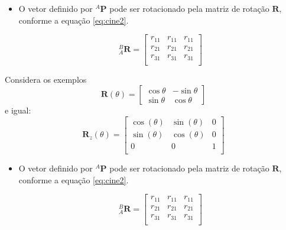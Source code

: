 \documentclass[t]{beamer}
\begin{document}
\begin{frame}[t]
	\begin{itemize}
		\item O vetor definido por ${}^A\mathbf{P}$ pode ser rotacionado pela matriz de rotação $\mathbf{R}$, conforme a equação \eqref{eq:cine2}.

		\begin{equation}\label{eq:cine2}
			{}_A^B
			\mathbf{R} = 
			\begin{bmatrix}
			r_{11} & r_{11} & r_{11}\\
			r_{21} & r_{21} & r_{21}\\
			r_{31} & r_{31} & r_{31}\\
			\end{bmatrix}
			\end{equation}
	
	\end{itemize}

	\begin{exampleblock}{Considera os exemplos}
		\begin{equation*}
			\mathbf{R}(\theta) = 
			\begin{bmatrix}
				\cos \theta &-\sin \theta \\\sin \theta &\cos \theta
			\end{bmatrix}
			\end{equation*}
		e igual:
		\begin{equation*}
			\mathbf{R}_z(\theta) = 
			\begin{bmatrix}
			\cos(\theta) & \sin(\theta) & 0\\
			\sin(\theta) & \cos(\theta) & 0\\
			0 & 0 & 1\\ 
			\end{bmatrix}
			\end{equation*}
	\end{exampleblock}

\end{frame}

\begin{frame}[t]
	\begin{itemize}
		\item O vetor definido por ${}^A\mathbf{P}$ pode ser rotacionado pela matriz de rotação $\mathbf{R}$, conforme a equação \eqref{eq:cine2}.

		\begin{equation}\label{eq:cine2}
			{}_A^B
			\mathbf{R} = 
			\begin{bmatrix}
			r_{11} & r_{11} & r_{11}\\
			r_{21} & r_{21} & r_{21}\\
			r_{31} & r_{31} & r_{31}\\
			\end{bmatrix}
			\end{equation}
	
	\end{itemize}


\end{frame}
\end{document}
